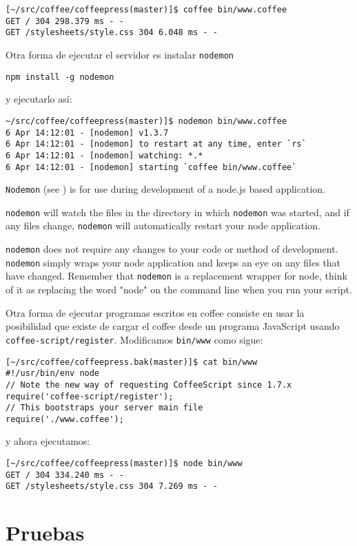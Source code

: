\begin{verbatim}
[~/src/coffee/coffeepress(master)]$ coffee bin/www.coffee 
GET / 304 298.379 ms - -
GET /stylesheets/style.css 304 6.048 ms - -
\end{verbatim}
Otra forma de ejecutar el servidor es instalar \verb|nodemon|
\begin{verbatim}
npm install -g nodemon
\end{verbatim}
y ejecutarlo así:
\begin{verbatim}
~/src/coffee/coffeepress(master)]$ nodemon bin/www.coffee
6 Apr 14:12:01 - [nodemon] v1.3.7
6 Apr 14:12:01 - [nodemon] to restart at any time, enter `rs`
6 Apr 14:12:01 - [nodemon] watching: *.*
6 Apr 14:12:01 - [nodemon] starting `coffee bin/www.coffee`
\end{verbatim}
\verb|Nodemon| (see
)
is for use during development of a node.js based application.

\verb|nodemon| will watch the files in the directory in which \verb|nodemon| was started, and if any files change, \verb|nodemon| will automatically restart your node application.

\verb|nodemon| does not require any changes to your code or method of
development. \verb|nodemon| simply wraps your node application and keeps an eye
on any files that have changed. Remember that \verb|nodemon| is a replacement
wrapper for node, think of it as replacing the word "node" on the command
line when you run your script.

Otra forma de ejecutar programas escritos en coffee 
consiste en usar la posibilidad que existe de cargar
el coffee desde un programa JavaScript usando 
\verb|coffee-script/register|. Modificamos \verb|bin/www|
como sigue:
\begin{verbatim}
[~/src/coffee/coffeepress.bak(master)]$ cat bin/www
#!/usr/bin/env node
// Note the new way of requesting CoffeeScript since 1.7.x
require('coffee-script/register');
// This bootstraps your server main file
require('./www.coffee');
\end{verbatim}
y ahora ejecutamos:
\begin{verbatim}
[~/src/coffee/coffeepress(master)]$ node bin/www
GET / 304 334.240 ms - -
GET /stylesheets/style.css 304 7.269 ms - -
\end{verbatim}


\section{Pruebas}

